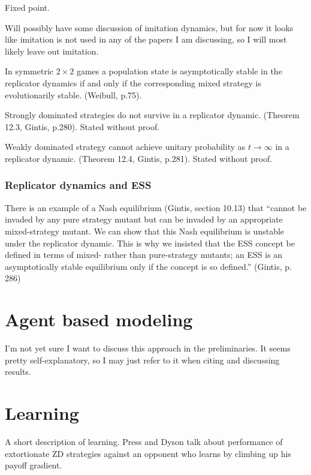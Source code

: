 \begin{definition}
Fixed point.
\end{definition}

Will possibly have some discussion of imitation dynamics, but for now it looks like imitation is not used in any of the papers I am discussing, so I will most likely leave out imitation.
\begin{theorem}
In symmetric $2 \times 2$ games a population state is asymptotically stable in the replicator dynamics if and only if the corresponding mixed strategy is evolutionarily stable. (Weibull, p.75).
\end{theorem}

\begin{theorem}
Strongly dominated strategies do not survive in a replicator dynamic. (Theorem 12.3, Gintis, p.280). Stated without proof.
\end{theorem}
\begin{theorem}
Weakly dominated strategy cannot achieve unitary probability as $t \rightarrow \infty$ in a replicator dynamic. (Theorem 12.4, Gintis, p.281). Stated without proof.
\end{theorem}


\subsubsection{Replicator dynamics and ESS}
There is an example of a Nash equilibrium (Gintis, section 10.13) that ``cannot be invaded by any pure strategy mutant but can be invaded by an appropriate mixed-strategy mutant. We can show that this Nash equilibrium is unstable under the replicator dynamic. This is why we insisted that the ESS concept be defined in terms of mixed- rather than pure-strategy mutants; an ESS is an asymptotically stable equilibrium only if the concept is so defined.'' (Gintis, p. 286)

\section{Agent based modeling}
I'm not yet sure I want to discuss this approach in the preliminaries. It seems pretty self-explanatory, so I may just refer to it when citing and discussing results.

\section{Learning}
A short description of learning. Press and Dyson talk about performance of extortionate ZD strategies against an opponent who learns by climbing up his payoff gradient.

